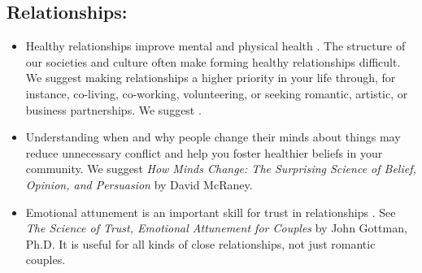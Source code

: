 \documentclass[12pt,letterpaper]{book}
\begin{document}
\subsection*{Relationships:}
\begin{itemize}
   \item Healthy relationships improve mental and physical health \cite{holt-lunstadRelationships}. The structure of our societies and culture often make forming healthy relationships difficult. We suggest making relationships a higher priority in your life through, for instance, co-living, co-working, volunteering, or seeking romantic, artistic, or business partnerships. We suggest \textcite{brownDaring}. 
   \item Understanding when and why people change their minds about things may reduce unnecessary conflict and help you foster healthier beliefs in your community. We suggest \textit{How Minds Change: The Surprising Science of Belief, Opinion, and Persuasion} by David McRaney.
   \item Emotional attunement is an important skill for trust in relationships \cite{gottmanTrust}. See \textit{The Science of Trust, Emotional Attunement for Couples} by John Gottman, Ph.D. It is useful for all kinds of close relationships, not just romantic couples.

\end{itemize}
\end{document}
